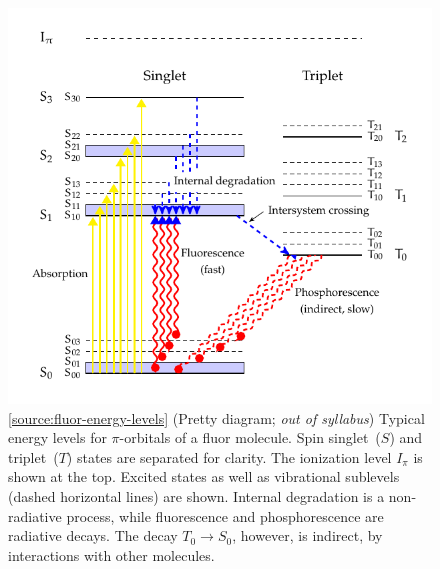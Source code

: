 \documentclass[oneside]{book}
\begin{document}
\begin{figure}[H]
    \centering
    \includegraphics[width=\textwidth,page=1]{../images/Energy level diagram(s)/energy-level-1.pdf}
    \caption{\ref{source:fluor-energy-levels} (Pretty diagram; \emph{out of syllabus}) Typical energy levels for $\pi$-orbitals of a fluor molecule. Spin singlet~($S$) and triplet~($T$) states are separated for clarity. The ionization level $I_\pi$ is shown at the top.  Excited states as well as vibrational sublevels (dashed horizontal lines) are shown. Internal degradation is a non-radiative process, while fluorescence and phosphorescence are radiative decays.  The decay $T_0 \to S_0$, however, is indirect, by interactions with other molecules.}
    \label{fig:fluor-energy-levels}
\end{figure}
\vfill
\newpage
\null
\vfill
\end{document}
